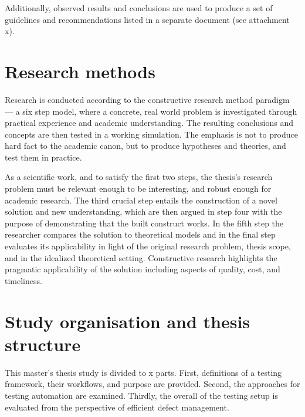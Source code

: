 \documentclass[12pt,a4paper,oneside,pdftex]{report}
\begin{document}
Additionally, observed results and conclusions are used to produce a set of guidelines and recommendations listed in a separate document (see attachment x). %

\section{Research methods}
Research is conducted according to the constructive research method paradigm --- a six step model, where a concrete, real world problem is investigated through practical experience and academic understanding. The resulting conclusions and concepts are then tested in a working simulation. The emphasis is not to produce hard fact to the academic canon, but to produce hypotheses and theories, and test them in practice.

As a scientific work, and to satisfy the first two steps, the thesis's research problem must be relevant enough to be interesting, and robust enough for academic research. The third crucial step entails the construction of a novel solution and new understanding, which are then argued in step four with the purpose of demonstrating that the built construct works. In the fifth step the researcher compares the solution to theoretical models and in the final step evaluates its applicability in light of the original research problem, thesis scope, and in the idealized theoretical setting. Constructive research highlights the pragmatic applicability of the solution including aspects of quality, cost, and timeliness.

\begin{comment}
Below to reference works from SoberIT slideset.

Kasanen, Eero, Lukka Kari, and Arto Siitonen. 1993. The Constructive Approach in Management Accounting Research. Journal of Management Accounting Research, 5 (1), pp. 243-263.

Shaw, M. 2001. The Coming-of-Age of Software Architecture Research. Proceedings of ICSE-2001, pp. 657-664. Los Alamitos, CA: IEEE Computer Society Press.
\end{comment}


\section{Study organisation and thesis structure}
\label{section:structure}
This master's thesis study is divided to x parts. First, definitions of a testing framework, their workflows, and purpose are provided. Second, the approaches for testing automation are examined. Thirdly, the overall of the testing setup is evaluated from the perspective of efficient defect management. 
\end{document}
